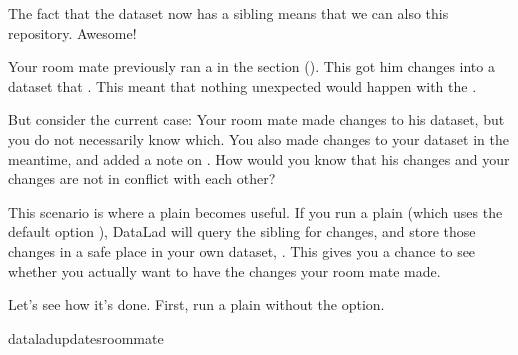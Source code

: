 \sphinxAtStartPar
The fact that the  dataset now has a sibling means that we
can also  this repository. Awesome!

\sphinxAtStartPar
Your room mate previously ran a  in the section
{\hyperref[\detokenize{basics/101-119-sharelocal4:update}]{}} (). This got him
changes  into a dataset that .
This meant that nothing unexpected would happen with the
.

\sphinxAtStartPar
But consider the current case: Your room mate made changes to his
dataset, but you do not necessarily know which. You also made
changes to your dataset in the meantime, and added a note on
.
How would you know that his changes and
your changes are not in conflict with each other?

\sphinxAtStartPar
This scenario is where a plain  becomes useful.
If you run a plain  (which uses the default option ), DataLad will query the sibling
for changes, and store those changes in a safe place in your own
dataset, .
This gives you a chance to see whether you actually want to have the
changes your room mate made.

\ignorespaces 
\sphinxAtStartPar
Let’s see how it’s done. First, run a plain  without
the  option.

\begin{sphinxVerbatim}[commandchars=\\\{\}]
dataladupdate\PYGZhy{}sroommate
\end{sphinxVerbatim}

